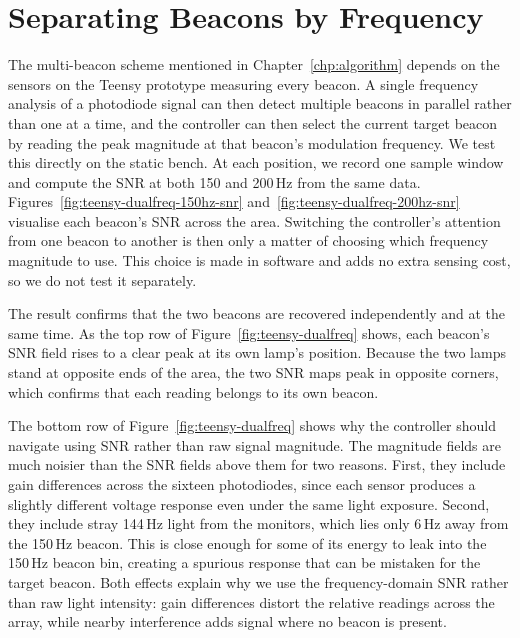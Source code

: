 \section{Separating Beacons by Frequency}
\label{sec:freq-separation}

The multi-beacon scheme mentioned in Chapter~\ref{chp:algorithm} depends on the sensors on the Teensy prototype measuring every beacon. A single frequency analysis of a photodiode signal can then detect multiple beacons in parallel rather than one at a time, and the controller can then select the current target beacon by reading the peak magnitude at that beacon's modulation frequency. We test this directly on the static bench. At each position, we record one sample window and compute the SNR at both 150 and 200\,Hz from the same data. Figures~\ref{fig:teensy-dualfreq-150hz-snr} and~\ref{fig:teensy-dualfreq-200hz-snr} visualise each beacon's SNR across the area. Switching the controller's attention from one beacon to another is then only a matter of choosing which frequency magnitude to use. This choice is made in software and adds no extra sensing cost, so we do not test it separately.

The result confirms that the two beacons are recovered independently and at the same time. As the top row of Figure~\ref{fig:teensy-dualfreq} shows, each beacon's SNR field rises to a clear peak at its own lamp's position. Because the two lamps stand at opposite ends of the area, the two SNR maps peak in opposite corners, which confirms that each reading belongs to its own beacon.

The bottom row of Figure~\ref{fig:teensy-dualfreq} shows why the controller should navigate using SNR rather than raw signal magnitude. The magnitude fields are much noisier than the SNR fields above them for two reasons. First, they include gain differences across the sixteen photodiodes, since each sensor produces a slightly different voltage response even under the same light exposure. Second, they include stray 144\,Hz light from the monitors, which lies only 6\,Hz away from the 150\,Hz beacon. This is close enough for some of its energy to leak into the 150\,Hz beacon bin, creating a spurious response that can be mistaken for the target beacon. Both effects explain why we use the frequency-domain SNR rather than raw light intensity: gain differences distort the relative readings across the array, while nearby interference adds signal where no beacon is present.


